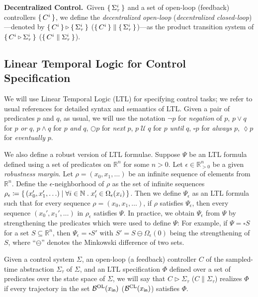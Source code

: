 \smallskip
\noindent\textbf{Decentralized Control.}\
Given $\set{\Sigma_\tau^i} $ and a set of open-loop (feedback) controllers $\set{C^i} $, we define the \emph{decentralized open-loop} (\emph{decentralized closed-loop})---denoted by $\set{C^i} \triangleright \set{\Sigma_\tau^i} $ ($\set{C^i} \parallel \set{\Sigma_\tau^i} $)---as the product transition system of $\set{C^i\triangleright \Sigma^i_\tau} $ ($\set{C^i\parallel \Sigma^i_\tau} $).

\subsection{Linear Temporal Logic for Control Specification}

We will use Linear Temporal Logic (LTL) for specifying control tasks; we refer to usual references \cite{baier2008principles} for detailed syntax and semantics of LTL.
Given a pair of predicates $p$ and $q$, as usual, we will use the notation 
$\lnot p$ for \emph{negation} of $p$, 
$p\vee q$ for $p$ \emph{or} $q$,
$p\wedge q$ for $p$ \emph{and} $q$,
$\bigcirc p$ for \emph{next} $p$,
$p\; \mathcal{U}\; q$ for $p$ \emph{until} $q$,
$\square p$ for \emph{always} $p$,
$\lozenge p$ for \emph{eventually} $p$.

We also define a robust version of LTL formulae.
Suppose $\Psi$ be an LTL formula defined using a set of predicates on $\mathbb{R}^n$ for some $n>0$.
Let $\epsilon\in \mathbb{R}^n_{>0}$ be a given \emph{robustness margin}.
Let $\rho=(x_0,x_1,\ldots)$ be an infinite sequence of elements from $\mathbb{R}^n$.
Define the $\epsilon$-neighborhood of $\rho$ as the set of infinite sequences $\rho_\epsilon\coloneqq \set{(x_0',x_1',\ldots) \mid \forall i\in \mathbb{N}\;.\; x_i'\in \Omega_\epsilon(x_i)}$.
Then we define $\Psi_\epsilon$ as an LTL formula such that for every sequence $\rho=(x_0,x_1,\ldots)$, if $\rho$ satisfies $\Psi_\epsilon$, then every sequence $(x_0',x_1',\ldots)$ in $\rho_\epsilon$ satisfies $\Psi$.
In practice, we obtain $\Psi_\epsilon$ from $\Psi$ by strengthening the predicates which were used to define $\Psi$: 
For example, if $\Psi = \square S$ for a set $S\subseteq \mathbb{R}^n$, then $\Psi_\epsilon = \square S'$ with $S' = S \ominus \Omega_\epsilon(0)$ being the strengthening of $S$, where ``$\ominus$'' denotes the Minkowski difference of two sets.

Given a control system $\Sigma$, an open-loop (a feedback) controller $C$ of the sampled-time abstraction $\Sigma_\tau$ of $\Sigma$, and an LTL specification $\Phi$ defined over a set of predicates over the state space of $\Sigma$, we will say that $C\triangleright \Sigma_\tau$ ($C\parallel \Sigma_\tau$) realizes $\Phi$ if every trajectory in the set $\mathcal{B}^{\mathrm{OL}}(x_{\mathsf{in}})$ ($\mathcal{B}^{\mathrm{CL}}(x_{\mathsf{in}})$) satisfies $\Phi$.

